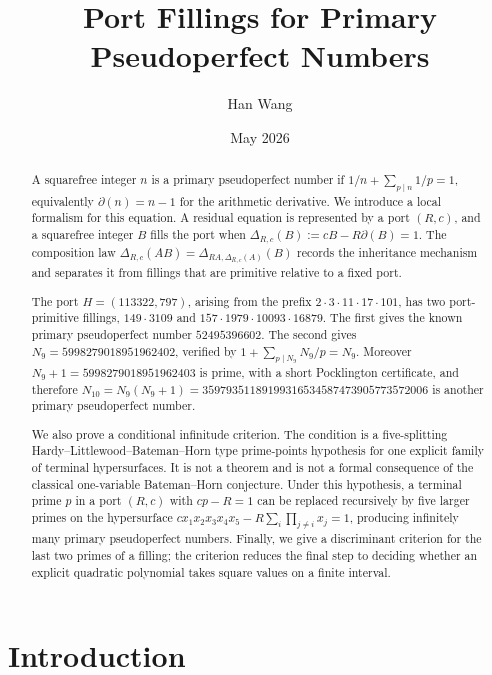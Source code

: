 \documentclass[11pt]{amsart}
\title[Port Fillings for Primary Pseudoperfect Numbers]{Port Fillings for Primary Pseudoperfect Numbers}
\author{Han Wang}
\date{May 2026}
\theoremstyle{plain}
\theoremstyle{definition}
\theoremstyle{remark}
\begin{document}
\begin{abstract}
A squarefree integer $n$ is a primary pseudoperfect number if $1/n+\sum_{p\mid n}1/p=1$, equivalently $\partial(n)=n-1$ for the arithmetic derivative.  We introduce a local formalism for this equation.  A residual equation is represented by a port $(R,c)$, and a squarefree integer $B$ fills the port when $\Delta_{R,c}(B):=cB-R\partial(B)=1$.  The composition law $\Delta_{R,c}(AB)=\Delta_{RA,\Delta_{R,c}(A)}(B)$ records the inheritance mechanism and separates it from fillings that are primitive relative to a fixed port.

The port $H=(113322,797)$, arising from the prefix $2\cdot3\cdot11\cdot17\cdot101$, has two port-primitive fillings, $149\cdot3109$ and $157\cdot1979\cdot10093\cdot16879$.  The first gives the known primary pseudoperfect number $52495396602$.  The second gives $N_9=5998279018951962402$, verified by $1+\sum_{p\mid N_9}N_9/p=N_9$.  Moreover $N_9+1=5998279018951962403$ is prime, with a short Pocklington certificate, and therefore $N_{10}=N_9(N_9+1)=35979351189199316534587473905773572006$ is another primary pseudoperfect number.

We also prove a conditional infinitude criterion.  The condition is a five-splitting Hardy--Littlewood--Bateman--Horn type prime-points hypothesis for one explicit family of terminal hypersurfaces.  It is not a theorem and is not a formal consequence of the classical one-variable Bateman--Horn conjecture.  Under this hypothesis, a terminal prime $p$ in a port $(R,c)$ with $cp-R=1$ can be replaced recursively by five larger primes on the hypersurface $c x_1x_2x_3x_4x_5-R\sum_i\prod_{j\ne i}x_j=1$, producing infinitely many primary pseudoperfect numbers.  Finally, we give a discriminant criterion for the last two primes of a filling; the criterion reduces the final step to deciding whether an explicit quadratic polynomial takes square values on a finite interval.
\end{abstract}

\maketitle

\tableofcontents

\section{Introduction}
\end{document}
